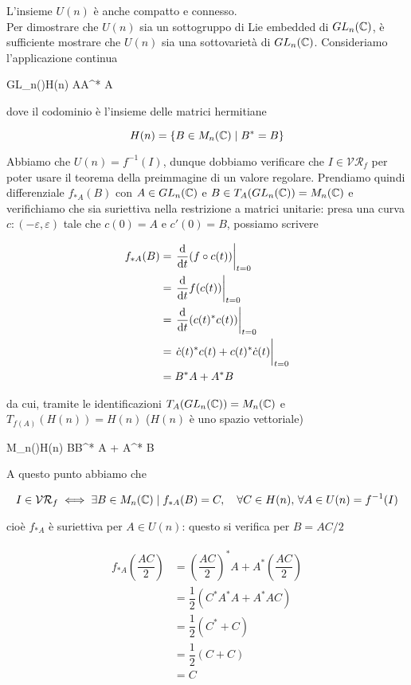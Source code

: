 L'insieme $ U(n) $ è anche compatto e connesso.\\
Per dimostrare che $ U(n) $ sia un sottogruppo di Lie embedded di $ GL_{n}(\mathbb{C}) $, è sufficiente mostrare che $ U(n) $ sia una sottovarietà di $ GL_{n}(\mathbb{C}) $. Consideriamo l'applicazione continua

%
	{GL_{n}(\C)}{H(n)}%
	{A}{A^{*} A}

dove il codominio è l'insieme delle matrici hermitiane

\begin{equation}
	H(n) = \{ B \in M_{n}(\mathbb{C}) \mid B^{*} = B \}
\end{equation}

Abbiamo che $ U(n) = f^{-1}(I) $, dunque dobbiamo verificare che $ I \in \mathcal{VR}_{f} $ per poter usare il teorema della preimmagine di un valore regolare. Prendiamo quindi differenziale $ f_{*A}(B) $ con $ A \in GL_{n}(\mathbb{C}) $ e $ B \in T_{A}(GL_{n}(\mathbb{C})) = M_{n}(\mathbb{C}) $ e verifichiamo che sia suriettiva nella restrizione a matrici unitarie: presa una curva $ c : (-\varepsilon,\varepsilon) $ tale che $ c(0) = A $ e $ c'(0) = B $, possiamo scrivere

\begin{align}
	\begin{split}
		f_{*A}(B) &= \eval{ \dv{t} (f \circ c(t)) }_{t=0}\\
		&= \eval{ \dv{t} f(c(t)) }_{t=0}\\
		&= \eval{ \dv{t} (c(t)^{*} c(t)) }_{t=0}\\
		&= \eval{ \dot{c}(t)^{*} c(t) + c(t)^{*} \dot{c}(t) }_{t=0}\\
		&= B^{*} A + A^{*} B
	\end{split}
\end{align}

da cui, tramite le identificazioni $ T_{A}(GL_{n}(\mathbb{C})) = M_{n}(\mathbb{C}) $ e $ T_{f(A)}(H(n)) = H(n) $ ($ H(n) $ è uno spazio vettoriale)

%
	{M_{n}(\C)}{H(n)}%
	{B}{B^{*} A + A^{*} B}

A questo punto abbiamo che

\begin{equation}
	I \in \mathcal{VR}_{f} \iff \exists B \in M_{n}(\C) \mid f_{*A}(B) = C \qcomma \forall C \in H(n), \, \forall A \in U(n) = f^{-1}(I)
\end{equation}

cioè $ f_{*A} $ è suriettiva per $ A \in U(n) $: questo si verifica per $ B = AC/2 $

\begin{align}
	\begin{split}
		f_{*A} \left( \dfrac{A C}{2} \right) &= \left( \dfrac{A C}{2} \right)^{*} A + A^{*} \left( \dfrac{A C}{2} \right)\\
		&= \dfrac{1}{2} (C^{*} A^{*} A + A^{*} A C)\\
		&= \dfrac{1}{2} (C^{*} + C)\\
		&= \dfrac{1}{2} (C + C)\\
		&= C
	\end{split}
\end{align}

